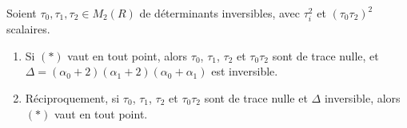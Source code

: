 \begin{enonce}
Soient $\tau_0, \tau_1, \tau_2 \in M_2(R)$ de déterminants inversibles, avec $\tau_i^2$ et $(\tau_0\tau_2)^2$ scalaires.
\begin{enumerate}
\item Si $(*)$ vaut en tout point, alors $\tau_0$, $\tau_1$, $\tau_2$ et $\tau_0\tau_2$ sont de trace nulle, et $\Delta = (\alpha_0 + 2)(\alpha_1 + 2)(\alpha_0 + \alpha_1)$ est inversible.
\item Réciproquement, si $\tau_0$, $\tau_1$, $\tau_2$ et $\tau_0\tau_2$ sont de trace nulle et $\Delta$ inversible, alors $(*)$ vaut en tout point.
\end{enumerate}
\end{enonce}

